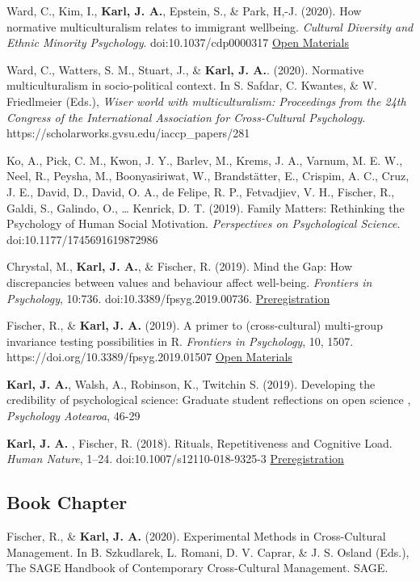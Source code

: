 \documentclass[11pt]{article} %
\begin{document}
\begin{hangparas}{2em}{1}
Ward, C., Kim, I., \textbf{Karl, J. A.}, Epstein, S., \& Park, H,-J. (2020). How normative multiculturalism relates to immigrant wellbeing. \emph{Cultural Diversity and Ethnic Minority Psychology}. doi:10.1037/cdp0000317 \href{https://osf.io/qz8jb/}{Open Materials} 

Ward, C., Watters, S. M., Stuart, J., & \textbf{Karl, J. A.}. (2020). Normative multiculturalism in socio-political context. In S. Safdar, C. Kwantes, & W. Friedlmeier (Eds.), \emph{Wiser world with multiculturalism: Proceedings from the 24th Congress of the International Association for Cross-Cultural Psychology}. https://scholarworks.gvsu.edu/iaccp_papers/281

Ko, A., Pick, C. M., Kwon, J. Y., Barlev, M., Krems, J. A., Varnum, M. E. W., Neel, R., Peysha, M., Boonyasiriwat, W., Brandstätter, E., Crispim, A. C., Cruz, J. E., David, D., David, O. A., de Felipe, R. P., Fetvadjiev, V. H., Fischer, R., Galdi, S., Galindo, O., … Kenrick, D. T. (2019). Family Matters: Rethinking the Psychology of Human Social Motivation. \emph{Perspectives on Psychological Science}. doi:10.1177/1745691619872986

Chrystal, M., \textbf{Karl, J. A.}, \& Fischer, R. (2019). Mind the Gap: How discrepancies between values and behaviour affect well-being. \emph{Frontiers in Psychology}, 10:736. doi:10.3389/fpsyg.2019.00736. \href{https://osf.io/t8evu/}{Preregistration} 

Fischer, R., \& \textbf{Karl, J. A.} (2019). A primer to (cross-cultural) multi-group invariance testing possibilities in R. \emph{Frontiers in Psychology}, 10, 1507. https://doi.org/10.3389/fpsyg.2019.01507 \href{https://osf.io/agr5e/}{Open Materials} 

\textbf{Karl, J. A.}, Walsh, A., Robinson, K., Twitchin S. (2019). Developing the credibility of psychological science: Graduate student reflections on open science , \emph{Psychology Aotearoa}, 46-29

\textbf{Karl, J. A.} , Fischer, R. (2018). Rituals, Repetitiveness and Cognitive Load. \emph{Human Nature}, 1–24. doi:10.1007/s12110-018-9325-3 \href{https://osf.io/rsu9x/}{Preregistration} \\
\end{hangparas}

\subsection*{Book Chapter}
\begin{hangparas}{2em}{1}
 Fischer, R., \& \textbf{Karl, J. A.} (2020). Experimental Methods in Cross-Cultural Management. In B. Szkudlarek, L. Romani, D. V. Caprar, \& J. S. Osland (Eds.), The SAGE Handbook of Contemporary Cross-Cultural Management. SAGE. \\
\end{hangparas}
\end{document}
